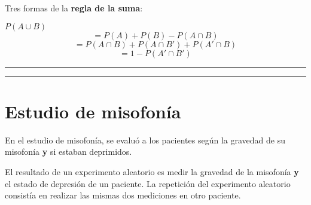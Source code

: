 \documentclass[
]{book}
\begin{document}
Tres formas de la \textbf{regla de la suma}:

\(P(A\cup B)\)\[=P(A) + P(B) - P(A\cap B)\]
\[=P(A \cap B)+P(A\cap B')+P(A'\cap B)\]
\[=1-P(A'\cap B')\]

\begin{center}\rule{0.5\linewidth}{0.5pt}\end{center}

\begin{center}\rule{0.5\linewidth}{0.5pt}\end{center}

\hypertarget{estudio-de-misofonuxeda}{%
\section{Estudio de misofonía}\label{estudio-de-misofonuxeda}}

En el estudio de misofonía, se evaluó a los pacientes según la gravedad de su misofonía \textbf{y} si estaban deprimidos.

El resultado de un experimento aleatorio es medir la gravedad de la misofonía \textbf{y} el estado de depresión de un paciente. La repetición del experimento aleatorio consistía en realizar las mismas dos mediciones en otro paciente.
\end{document}
